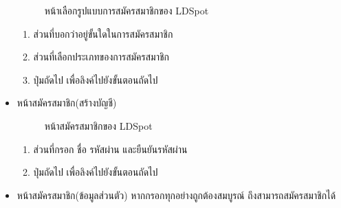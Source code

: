 \documentclass[12pt,oneside,openright,a4paper]{cpe-thai-project}
\begin{document}
\begin{itemize}
\begin{figure}[!ht]
    \caption{หน้าเลือกรูปแบบการสมัครสมาชิกของ LDSpot}\label{fig:register}
  \end{figure}
  \begin{enumerate}
    \item ส่วนที่บอกว่าอยู่ขั้นใดในการสมัครสมาชิก
    \item ส่วนที่เลือกประเภทของการสมัครสมาชิก
    \item ปุ่มถัดไป เพื่อลิงค์ไปยังขั้นตอนถัดไป
  \end{enumerate}
  \newpage
  \item หน้าสมัครสมาชิก(สร้างบัญชี)
  \begin{figure}[!ht]\centering
    \setlength{\fboxrule}{0.2mm} %
    \setlength{\fboxsep}{1cm}
    \caption{หน้าสมัครสมาชิกของ LDSpot}\label{fig:register2}
  \end{figure}
  \begin{enumerate}
    \item ส่วนที่กรอก ชื่อ รหัสผ่าน และยืนยันรหัสผ่าน
    \item ปุ่มถัดไป เพื่อลิงค์ไปยังขั้นตอนถัดไป
  \end{enumerate}
  \newpage
  \item หน้าสมัครสมาชิก(ข้อมูลส่วนตัว)
  หากกรอกทุกอย่างถูกต้องสมบูรณ์ ถึงสามารถสมัครสมาชิกได้
  \begin{figure}[!ht]\centering
    \setlength{\fboxrule}{0.2mm} %
    \setlength{\fboxsep}{1cm}

\end{figure}
\end{itemize}
\end{document}
